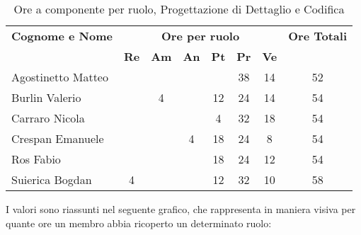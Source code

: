 \begin{table}[h]
	\centering
	\begin{tabular}{|l|c|c|c|c|c|c|c|}
		\toprule
		\textbf{Cognome e Nome} & \multicolumn{6}{c}{\textbf{Ore per ruolo}} & \textbf{Ore Totali} \\
		& \textbf{Re} & \textbf{Am} & \textbf{An} & \textbf{Pt} & \textbf{Pr} & \textbf{Ve} & \\
		
		\midrule
		Agostinetto Matteo & & & & & 38 & 14 & 52 \\
		Burlin Valerio & & 4 & & 12 & 24 & 14 & 54 \\ 
		Carraro Nicola & & & & 4 & 32 & 18 & 54 \\
		Crespan Emanuele & & & 4 & 18 & 24 & 8 & 54 \\
		Ros Fabio & & & & 18 & 24 & 12 & 54 \\
		Suierica Bogdan & 4 & & & 12 & 32 & 10 & 58 \\
		
		\bottomrule
	\end{tabular}
	\caption{Ore a componente per ruolo, Progettazione di Dettaglio e Codifica}
\end{table}

\noindent I valori sono riassunti nel seguente grafico, che rappresenta in maniera visiva per quante ore un membro abbia ricoperto un determinato ruolo:

